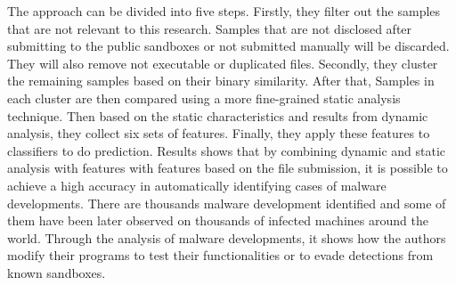 \documentclass[11pt]{article}
\begin{document}
	The approach can be divided into five steps. Firstly, they filter out the samples that are not relevant to this research. Samples that are not disclosed after submitting to the public sandboxes or not submitted manually will be discarded. They will also remove not executable or duplicated files.  Secondly, they cluster the remaining samples based on their binary similarity. After that, Samples in each cluster are then compared using a more fine-grained static analysis technique. Then based on the static characteristics and results from dynamic analysis, they collect six sets of features. Finally, they apply these features to classifiers to do prediction. Results shows that by combining dynamic and static analysis with features with features based on the file submission, it is possible to achieve a high accuracy in automatically identifying cases of malware developments. There are thousands malware development identified and some of them have been later observed on thousands of infected machines around the world. Through the analysis of malware developments, it shows how the authors modify their programs to test their functionalities or to evade detections from known sandboxes. 
	
\end{document}
